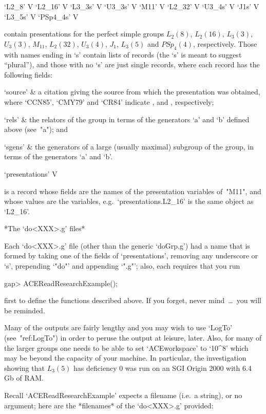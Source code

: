 \>`L2_8' V
\>`L2_16' V
\>`L3_3s' V
\>`U3_3s' V
\>`M11' V
\>`L2_32' V
\>`U3_4s' V
\>`J1s' V
\>`L3_5s' V
\>`PSp4_4s' V

contain  presentations  for  the  perfect  simple   groups   $L_2(8)$,
$L_2(16)$, $L_3(3)$, $U_3(3)$, $M_{11}$, $L_2(32)$,  $U_3(4)$,  $J_1$,
$L_3(5)$ and $PSp_4(4)$, respectively. Those with names ending in  `s'
contain lists of records (the `s' is meant to suggest ``plural''), and
those with no `s' are just single records, where each record  has  the
following fields:

\beginitems

\quad`source' & 
a citation giving the source from which the presentation was obtained,
where `CCN85', `CMY79' and `CR84' indicate \cite{CCN85},  \cite{CMY79}
and \cite{CR84}, respectively;

\quad`rels' & 
the relators of the group in terms  of  the  generators  `a'  and  `b'
defined above (see~"a"); and

\quad`sgens' & 
the generators of a large (usually maximal) subgroup of the group,  in
terms of the generators `a' and `b'.

\enditems

\>`presentations' V

is a record whose fields are the names of the  presentation  variables
of~"M11",     and     whose     values     are     the      variables,
e.g.~`presentations.L2_16' is the same object as `L2_16'.

*The `do<XXX>.g' files*

Each `do<XXX>.g' file (other than the generic `doGrp.g')  had  a  name
that is formed  by  taking  one  of  the  fields  of  `presentations',
removing any  underscore  or  `s',  prepending  `"do"'  and  appending
`".g"'; also, each requires that you run

\beginexample
gap> ACEReadResearchExample();
\endexample

first to define the functions described above. If  you  forget,  never
mind~\dots~you will be reminded.

Many of the outputs are fairly lengthy and you may wish to use `LogTo'
(see~"ref:LogTo") in order to peruse the  output  at  leisure,  later.
Also, for many of the larger groups  one  needs  to  be  able  to  set
`ACEworkspace' to `10^8' which may be  beyond  the  capacity  of  your
machine. In particular, the investigation showing  that  $L_3(5)$  has
deficiency 0 was run on an SGI Origin 2000 with 6.4 Gb of RAM.

Recall `ACEReadResearchExample' expects a filename (i.e.~a string), or
no argument; here are the *filenames* of the `do<XXX>.g' provided:

